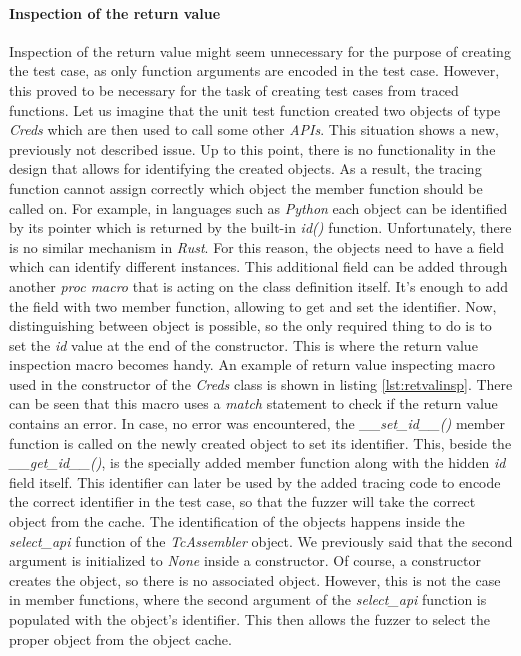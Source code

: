 \paragraph{Inspection of the return value}
Inspection of the return value might seem unnecessary for the purpose of creating the test case, as only function arguments are encoded in the test case. However, this proved to be necessary for the task of creating test cases from traced functions. Let us imagine that the unit test function created two objects of type \textit{Creds} which are then used to call some other \textit{APIs}. This situation shows a new, previously not described issue. Up to this point, there is no functionality in the design that allows for identifying the created objects. As a result, the tracing function cannot assign correctly which object the member function should be called on. For example, in languages such as \textit{Python} each object can be identified by its pointer which is returned by the built-in \textit{id()} function. Unfortunately, there is no similar mechanism in \textit{Rust}. For this reason, the objects need to have a field which can identify different instances. This additional field can be added through another \textit{proc macro} that is acting on the class definition itself. It's enough to add the field with two member function, allowing to get and set the identifier. Now, distinguishing between object is possible, so the only required thing to do is to set the \textit{id} value at the end of the constructor. This is where the return value inspection macro becomes handy. An example of return value inspecting macro used in the constructor of the \textit{Creds} class is shown in listing \ref{lst:retvalinsp}. There can be seen that this macro uses a \textit{match} statement to check if the return value contains an error. In case, no error was encountered, the \textit{\_\_set\_id\_\_()} member function is called on the newly created object to set its identifier. This, beside the \textit{\_\_get\_id\_\_()}, is the specially added member function along with the hidden \textit{id} field itself. This identifier can later be used by the added tracing code to encode the correct identifier in the test case, so that the fuzzer will take the correct object from the cache. The identification of the objects happens inside the \textit{select\_api} function of the \textit{TcAssembler} object. We previously said that the second argument is initialized to \textit{None} inside a constructor. Of course, a constructor creates the object, so there is no associated object. However, this is not the case in member functions, where the second argument of the \textit{select\_api} function is populated with the object's identifier. This then allows the fuzzer to select the proper object from the object cache.


